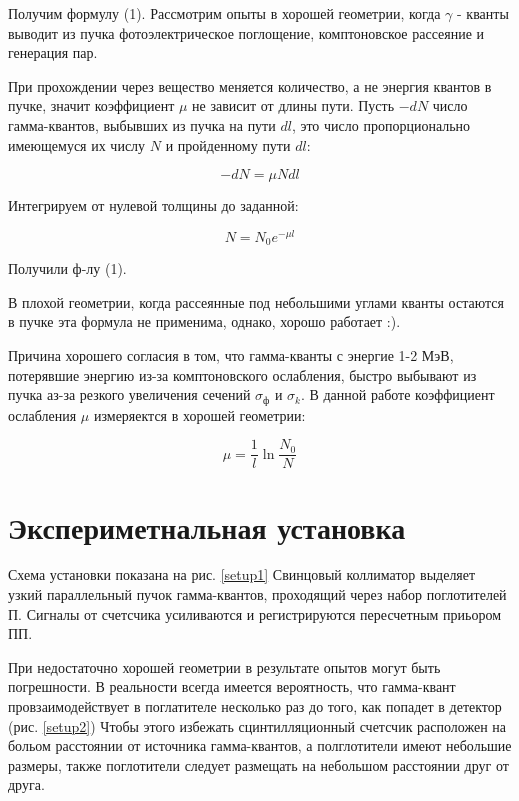 \documentclass[a4paper]{article}
\begin{document}
Получим формулу (1). Рассмотрим опыты в хорошей геометрии, когда $\gamma$ - кванты выводит из пучка фотоэлектрическое поглощение, комптоновское
рассеяние и генерация пар. \par 

При прохождении через вещество меняется количество, а не энергия квантов в пучке, значит коэффициент 
$\mu$ не зависит от длины пути. Пусть $-dN$ число гамма-квантов, выбывших из пучка на пути $dl$, это число 
пропорционально имеющемуся их числу $N$ и пройденному пути $dl$:

\begin{equation}
    -dN = \mu N dl
\end{equation}

Интегрируем от нулевой толщины до заданной:

\begin{equation}
    N = N_0 e^{-\mu l}
\end{equation}

Получили ф-лу (1).\par 

В плохой геометрии, когда рассеянные под небольшими углами кванты остаются в пучке эта формула не применима, однако,
хорошо работает :). \par
Причина хорошего согласия в том, что гамма-кванты с энергие 1-2 МэВ, потерявшие энергию из-за комптоновского ослабления, 
быстро выбывают из пучка аз-за резкого увеличения сечений $\sigma_ф$ и $\sigma_k$. В данной работе коэффициент ослабления $\mu$
измеряектся в хорошей геометрии:

\begin{equation}
    \mu = \frac{1}{l} \ln{\frac{N_0}{N}}
\end{equation}



\section{Экспериметнальная установка}

Схема установки показана на рис. \ref{setup1}
Свинцовый коллиматор выделяет узкий параллельный пучок гамма-квантов, проходящий через набор поглотителей П.
Сигналы от счетсчика усиливаются и регистрируются пересчетным приьором ПП. \par 

При недостаточно хорошей геометрии в результате опытов могут быть погрешности. В реальности всегда имеется 
вероятность, что гамма-квант провзаимодействует в поглатителе несколько раз до того, как попадет в детектор (рис. \ref{setup2})
Чтобы этого избежать сцинтилляционный счетсчик расположен на больом расстоянии от источника гамма-квантов, а полглотители 
имеют небольшие размеры, также поглотители следует размещать на небольшом расстоянии друг от друга. 
\end{document}
